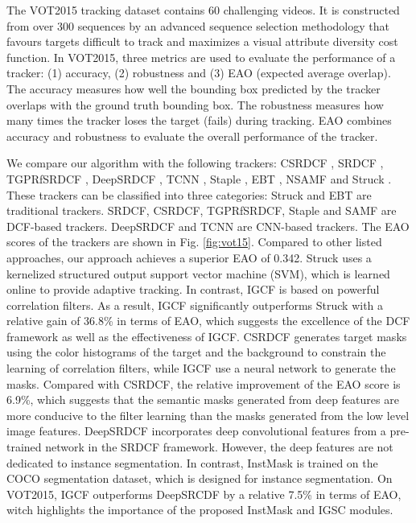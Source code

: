 \documentclass[review]{elsarticle}
\begin{document}
\begin{CJK*}{UTF8}{gbsn}
The VOT2015 \cite{Kristan2015TheVO} tracking dataset contains 60 challenging videos. It is constructed from over 300 sequences by an advanced sequence selection methodology that favours targets difficult to track and maximizes a visual attribute diversity cost function. 
In VOT2015, three metrics are used to evaluate the performance of a tracker: (1) accuracy, (2) robustness and (3) EAO (expected average overlap). The accuracy measures how well the bounding box predicted by the tracker overlaps with the ground truth bounding box. The robustness measures how many times the tracker loses the target (fails) during tracking. EAO combines accuracy and robustness to evaluate the overall performance of the tracker. 

We compare our algorithm with the following trackers: CSRDCF \cite{Lukezic2017DiscriminativeCF}, SRDCF \cite{Danelljan2015LearningSR}, TGPRfSRDCF \cite{gao2018tracking}, DeepSRDCF \cite{Danelljan2015ConvolutionalFF}, TCNN \cite{nam2016modeling}, Staple \cite{Bertinetto2016StapleC}, EBT \cite{Zhu2016BeyondLS}, NSAMF \cite{Hua2015OnlineOT} and Struck \cite{Hare2011StruckSO}.
These trackers can be classified into three categories: Struck and EBT are traditional trackers. SRDCF, CSRDCF, TGPRfSRDCF, Staple and SAMF are DCF-based trackers. DeepSRDCF and TCNN are CNN-based trackers.
The EAO scores of the trackers are shown in Fig. \ref{fig:vot15}. Compared to other listed approaches, our approach achieves a superior EAO of 0.342. 
Struck uses a kernelized structured output support vector machine (SVM), which is learned online to provide adaptive tracking. In contrast, IGCF is based on powerful correlation filters. As a result, IGCF significantly outperforms Struck with a relative gain of 36.8\% in terms of EAO, which suggests the excellence of the DCF framework as well as the effectiveness of IGCF.
CSRDCF generates target masks using the color histograms of the target and the background to constrain the learning of correlation filters, while IGCF use a neural network to generate the masks. Compared with CSRDCF, the relative improvement of the EAO score is 6.9\%, which suggests that the semantic masks generated from deep features are more conducive to the filter learning than the masks generated from the low level image features.
DeepSRDCF incorporates deep convolutional features from a pre-trained network in the SRDCF framework. However, the deep features are not dedicated to instance segmentation. In contrast, InstMask is trained on the COCO segmentation dataset, which is designed for instance segmentation. On VOT2015, IGCF outperforms DeepSRCDF by a relative 7.5\% in terms of EAO, witch highlights the importance of the proposed InstMask and IGSC modules.


\end{CJK*}
\end{document}
